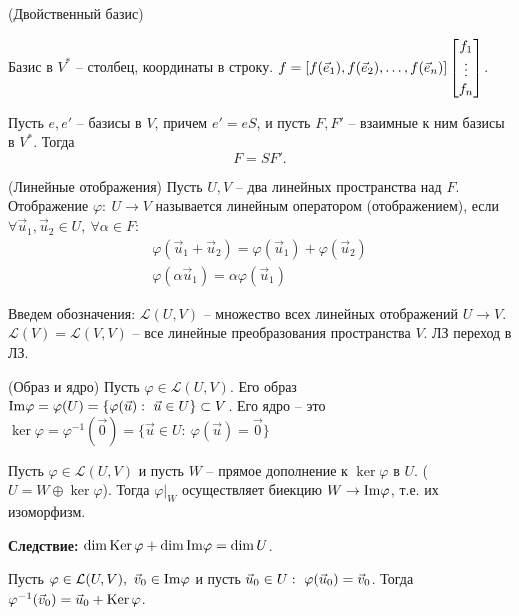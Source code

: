 \begin{multicols}{2}
\begin{definition}{(Двойственный базис)}{}
\end{definition}
Базис в $V^*$ -- столбец, координаты в строку. $f = [f(\vec{e}_1), f(\vec{e}_2), \ldots, f(\vec{e}_n)] \begin{bmatrix}
    f_1\\
    \vdots\\
    f_n
\end{bmatrix}$.
\begin{theorema}{}{}
    Пусть $e, e'$ -- базисы в $V$, причем $e' = eS$, и пусть $F, F'$ -- взаимные к ним базисы в $V^*$. Тогда 
    \[
        F = SF'.
        \]
\end{theorema}
\begin{definition}{(Линейные отображения)}{}
    Пусть $U, V$ -- два линейных пространства над $F$. Отображение $\varphi: \ U\to V$ называется линейным оператором (отображением), если $\forall \vec{u}_1, \vec{u}_2 \in U, \ \forall \alpha \in F$:
    \[
        \begin{array}{c}
            \varphi(\vec{u}_1 + \vec{u}_2) = \varphi(\vec{u}_1) + \varphi(\vec{u}_2)\\
            \varphi(\alpha \vec{u}_1) = \alpha \varphi(\vec{u}_1)  
        \end{array}
        \]
\end{definition}
Введем обозначения: $\mathcal{L}(U,V)$ -- множество всех линейных отображений $U \to V$. $\mathcal{L}(V) = \mathcal{L}(V,V)$ -- все линейные преобразования пространства $V$. ЛЗ переход в ЛЗ.
\begin{definition}{(Образ и ядро)}{}
    Пусть $\varphi \in \mathcal{L}(U,V)$. Его образ $\mathrm{Im} \varphi = \varphi (U) = \{\varphi(\vec{u}): \ \vec{u} \in U\} \subset V$.
    Его ядро -- это $\ker \varphi = \varphi^{-1} (\vec{0}) = \{\vec{u} \in U: \ \varphi(\vec{u}) = \vec{0}\} $
\end{definition}
\begin{lemma}{}{}
    Пусть $\varphi \in \mathcal{L}(U,V)$ и пусть $W$ -- прямое дополнение к $\ker \varphi$ в $U$. ($U = W \oplus \ker \varphi$). Тогда $\varphi\big|_{W}$ осуществляет биекцию $W\to \mathrm{Im} \varphi$, т.е. их изоморфизм.
\end{lemma}
\textbf{Следствие:} $\dim \operatorname{Ker} \varphi + \dim \mathrm{Im} \varphi = \dim U$.
\begin{proposition}{}{}
    Пусть $\varphi \in \mathcal{L}(U, V), \ \vv_0 \in \im \varphi$ и пусть $\vec{u}_0 \in U: \ \varphi(\vec{u}_0) = \vec{v}_0$. Тогда $\varphi^{-1}(\vec{v}_0) = \vec{u}_0 + \operatorname{Ker} \varphi$.
\end{proposition}
\begin{definition}{}{}

\end{definition}
\end{multicols}
